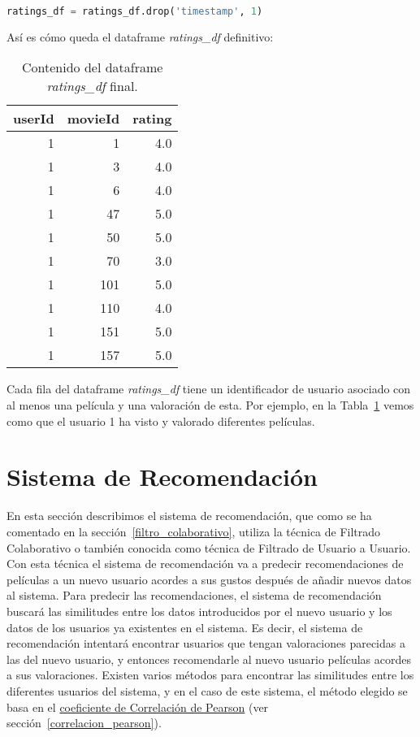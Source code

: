 \documentclass{uimppracticas}
\begin{document}
\begin{lstlisting}[language=python, basicstyle=\small]
ratings_df = ratings_df.drop('timestamp', 1)
\end{lstlisting}

Así es cómo queda el dataframe \textit{ratings\_df} definitivo:

\begin{table}[H]
	\centering
	\begin{tabular}{rrr}
		\toprule
		userId &  movieId &  rating \\
		\midrule
		1 &        1 &     4.0 \\
		1 &        3 &     4.0 \\
		1 &        6 &     4.0 \\
		1 &       47 &     5.0 \\
		1 &       50 &     5.0 \\
		1 &       70 &     3.0 \\
		1 &      101 &     5.0 \\
		1 &      110 &     4.0 \\
		1 &      151 &     5.0 \\
		1 &      157 &     5.0 \\
		\bottomrule
	\end{tabular}
	\caption{Contenido del dataframe \textit{ratings\_df} final.}
	\label{ratings_df_final}
\end{table}

Cada fila del dataframe \textit{ratings\_df} tiene un identificador de usuario asociado con al menos una película y una valoración de esta. Por ejemplo, en la Tabla~\ref{ratings_df_final} vemos como que el usuario 1 ha visto y valorado diferentes películas.

\section{Sistema de Recomendación}\label{sistema_recomendacion}

En esta sección describimos el sistema de recomendación, que como se ha comentado en la sección~\ref{filtro_colaborativo}, utiliza la técnica de Filtrado Colaborativo o también conocida como técnica de Filtrado de Usuario a Usuario. Con esta técnica el sistema de recomendación va a predecir recomendaciones de películas a un nuevo usuario acordes a sus gustos después de añadir nuevos datos al sistema. Para predecir las recomendaciones, el sistema de recomendación buscará las similitudes entre los datos introducidos por el nuevo usuario y los datos de los usuarios ya existentes en el sistema. Es decir, el sistema de recomendación intentará encontrar usuarios que tengan valoraciones parecidas a las del nuevo usuario, y entonces recomendarle al nuevo usuario películas acordes a sus valoraciones. Existen varios métodos para encontrar las similitudes entre los diferentes usuarios del sistema, y en el caso de este sistema, el método elegido se basa en el \href{https://es.wikipedia.org/wiki/Coeficiente_de_correlaci\%C3\%B3n_de_Pearson}{coeficiente de Correlación de Pearson} (ver sección~\ref{correlacion_pearson}).
\end{document}
